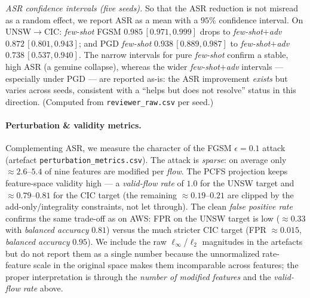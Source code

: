 \documentclass[preprint,12pt,authoryear]{elsarticle}
\begin{document}
\noindent\emph{ASR confidence intervals (five seeds).} So that the ASR reduction is
not misread as a random effect, we report ASR as a mean with a $95\%$ confidence
interval. On UNSW$\rightarrow$CIC: \emph{few-shot} FGSM $0.985\,[0.971,0.999]$ drops to
\emph{few-shot$+$adv} $0.872\,[0.801,0.943]$; and PGD \emph{few-shot}
$0.938\,[0.889,0.987]$ to \emph{few-shot$+$adv} $0.738\,[0.537,0.940]$. The narrow
intervals for pure \emph{few-shot} confirm a stable, high ASR (a genuine collapse),
whereas the wider \emph{few-shot$+$adv} intervals --- especially under PGD --- are
reported as-is: the ASR improvement \emph{exists} but varies across seeds, consistent
with a ``helps but does not resolve'' status in this direction. (Computed from
\texttt{reviewer\_raw.csv} per seed.)

\paragraph{Perturbation \& validity metrics.} Complementing ASR, we measure the
character of the FGSM $\epsilon{=}0.1$ attack (artefact
\texttt{perturbation\_metrics.csv}). The attack is \emph{sparse}: on average only
$\approx 2.6$--$5.4$ of nine features are modified per \emph{flow}. The PCFS
projection keeps feature-space validity high --- a \emph{valid-flow rate} of $1.0$
for the UNSW target and $\approx0.79$--$0.81$ for the CIC target (the remaining
$\approx0.19$--$0.21$ are clipped by the add-only/integrality constraints, not let
through). The clean \emph{false positive rate} confirms the same trade-off as on
AWS: FPR on the UNSW target is low ($\approx0.33$ with \emph{balanced accuracy}
$0.81$) versus the much stricter CIC target (FPR $\approx0.015$, \emph{balanced
accuracy} $0.95$). We include the raw $\ell_\infty$/$\ell_2$ magnitudes in the
artefacts but do not report them as a single number because the unnormalized rate-
feature scale in the original space makes them incomparable across features; the
proper interpretation is through the \emph{number of modified features} and the
\emph{valid-flow rate} above.
\end{document}
